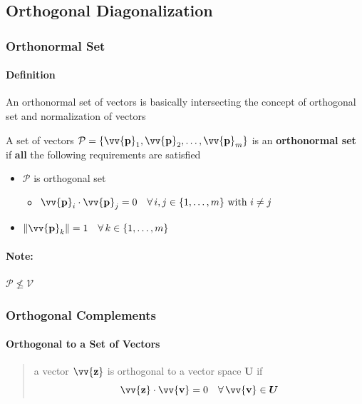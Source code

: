 \documentclass[11pt]{article}
\DeclareRobustCommand{\myvec}[1]{\vv{\mathbf{#1}}}
\newcommand{\myvecsp}[1]{\bm{\mathcal{#1}}}
\newcommand{\mysubvecsp}[1]{\bm{{#1}}}
\newcommand{\myset}[1]{\mathcal{#1}}
\newcommand{\dotprod}[2]{#1 \cdot #2}
\begin{document}
    \subsection{Orthogonal Diagonalization}
    \subsubsection{Orthonormal Set}
    \paragraph{Definition}

    An orthonormal set of vectors is basically intersecting the concept of orthogonal set and normalization of vectors
    \vspace{1ex}

    A set of vectors $\myset{P} = \{\myvec{p}_1, \myvec{p}_2, \dots, \myvec{p}_m\}$ is an \textbf{orthonormal set} \\
    if \textbf{all} the following requirements are satisfied
    \begin{itemize}
        \item $\myset{P}$ is orthogonal set
        \begin{itemize}
            \item $\dotprod{\myvec{p}_i}{\myvec{p}_j} = 0 \quad \forall\,i, j \in \{1, \dots, m\} \text{ with } i \neq j$
        \end{itemize}
        \item $\|\myvec{p}_k\| = 1 \quad \forall\,k \in \{1, \dots, m\}$
    \end{itemize}
    \paragraph{Note:} $\myset{P} \not\le \myvecsp{V}$

    
    \subsubsection{Orthogonal Complements}
    \paragraph{Orthogonal to a Set of Vectors}
    \begin{quote}
        a vector $\myvec{z}$ is orthogonal to a vector space $\mysubvecsp{U}$ if \\
        \[ \dotprod{\myvec{z}}{\myvec{v}} = 0 \quad \forall\,\myvec{v} \in \mysubvecsp{U} \]
    \end{quote}
    
\end{document}
